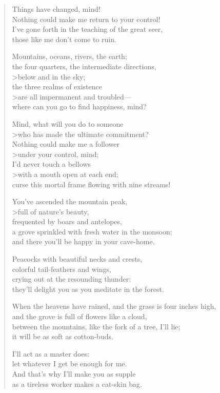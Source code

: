 \documentclass[12pt,openany]{book}%
\begin{document}
\begin{verse}
Things have changed, mind! \\
Nothing could make me return to your control! \\
I’ve gone forth in the teaching of the great seer, \\
those like me don’t come to ruin. 

Mountains, oceans, rivers, the earth; \\
the four quarters, the intermediate directions, \\>below and in the sky; \\
the three realms of existence \\>are all impermanent and troubled—\\
where can you go to find happiness, mind? 

Mind, what will you do to someone \\>who has made the ultimate commitment? \\
Nothing could make me a follower \\>under your control, mind; \\
I’d never touch a bellows \\>with a mouth open at each end; \\
curse this mortal frame flowing with nine streams! 

You’ve ascended the mountain peak, \\>full of nature’s beauty, \\
frequented by boars and antelopes, \\
a grove sprinkled with fresh water in the monsoon; \\
and there you’ll be happy in your cave-home. 

Peacocks with beautiful necks and crests, \\
colorful tail-feathers and wings, \\
crying out at the resounding thunder: \\
they’ll delight you as you meditate in the forest. 

When the heavens have rained, and the grass is four inches high, \\
and the grove is full of flowers like a cloud, \\
between the mountains, like the fork of a tree, I’ll lie; \\
it will be as soft as cotton-buds. 

I’ll act as a master does: \\
let whatever I get be enough for me. \\
And that’s why I’ll make you as supple \\
as a tireless worker makes a cat-skin bag. 


\end{verse}
\end{document}
